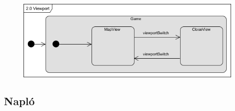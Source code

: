 		\begin{figure}[ht!]
			\begin{center}
				\includegraphics[scale=0.8]{resources/state_2-0_viewport.png}
				\caption{}
			\end{center}
		\end{figure}
	
	\subsection{Napló}

